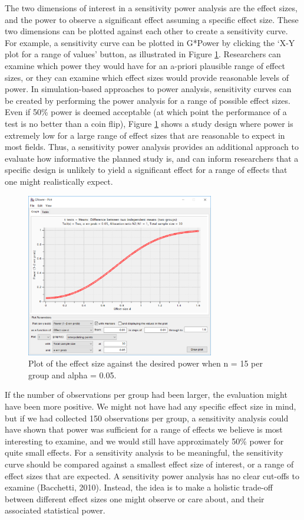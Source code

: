 \documentclass[
  english,
  ,jou, a4paper,floatsintext]{apa6}
\begin{document}
The two dimensions of interest in a sensitivity power analysis are the effect sizes, and the power to observe a significant effect assuming a specific effect size. These two dimensions can be plotted against each other to create a sensitivity curve. For example, a sensitivity curve can be plotted in G*Power by clicking the `X-Y plot for a range of values' button, as illustrated in Figure \ref{fig:gsens1}. Researchers can examine which power they would have for an a-priori plausible range of effect sizes, or they can examine which effect sizes would provide reasonable levels of power. In simulation-based approaches to power analysis, sensitivity curves can be created by performing the power analysis for a range of possible effect sizes. Even if 50\% power is deemed acceptable (at which point the performance of a test is no better than a coin flip), Figure \ref{fig:gsens1} shows a study design where power is extremely low for a large range of effect sizes that are reasonable to expect in most fields. Thus, a sensitivity power analysis provides an additional approach to evaluate how informative the planned study is, and can inform researchers that a specific design is unlikely to yield a significant effect for a range of effects that one might realistically expect.

\begin{figure}
\includegraphics[width=3.23in]{images/sensitivity1} \caption{Plot of the effect size against the desired power when n = 15 per group and alpha = 0.05.}\label{fig:gsens1}
\end{figure}

If the number of observations per group had been larger, the evaluation might have been more positive. We might not have had any specific effect size in mind, but if we had collected 150 observations per group, a sensitivity analysis could have shown that power was sufficient for a range of effects we believe is most interesting to examine, and we would still have approximately 50\% power for quite small effects. For a sensitivity analysis to be meaningful, the sensitivity curve should be compared against a smallest effect size of interest, or a range of effect sizes that are expected. A sensitivity power analysis has no clear cut-offs to examine (Bacchetti, 2010). Instead, the idea is to make a holistic trade-off between different effect sizes one might observe or care about, and their associated statistical power.
\end{document}
